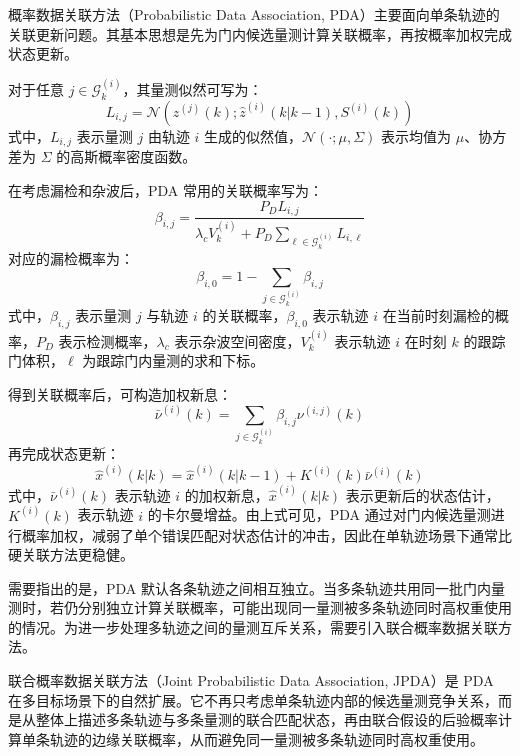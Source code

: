 \documentclass{xdupgthesis}
\begin{document}
概率数据关联方法（Probabilistic Data Association, PDA）主要面向单条轨迹的关联更新问题。其基本思想是先为门内候选量测计算关联概率，再按概率加权完成状态更新\cite{barshalom1975pda,chen2018weightedpda}。

对于任意 $j\in\mathcal{G}^{(i)}_k$，其量测似然可写为：
\begin{equation}
	L_{i,j}
	=
	\mathcal{N}
	\left(
	z^{(j)}(k);
	\hat{z}^{(i)}(k|k-1),
	S^{(i)}(k)
	\right)
\end{equation}
式中，$L_{i,j}$ 表示量测 $j$ 由轨迹 $i$ 生成的似然值，$\mathcal{N}(\cdot;\mu,\Sigma)$ 表示均值为 $\mu$、协方差为 $\Sigma$ 的高斯概率密度函数。

在考虑漏检和杂波后，PDA 常用的关联概率写为：
\begin{equation}
	\beta_{i,j}
	=
	\frac{P_D L_{i,j}}
	{\lambda_c V_k^{(i)}+P_D\sum\limits_{\ell\in\mathcal{G}^{(i)}_k}L_{i,\ell}}
\end{equation}
对应的漏检概率为：
\begin{equation}
	\beta_{i,0}
	=
	1-\sum_{j\in\mathcal{G}^{(i)}_k}\beta_{i,j}
\end{equation}
式中，$\beta_{i,j}$ 表示量测 $j$ 与轨迹 $i$ 的关联概率，$\beta_{i,0}$ 表示轨迹 $i$ 在当前时刻漏检的概率，$P_D$ 表示检测概率，$\lambda_c$ 表示杂波空间密度，$V_k^{(i)}$ 表示轨迹 $i$ 在时刻 $k$ 的跟踪门体积，$\ell$ 为跟踪门内量测的求和下标。

得到关联概率后，可构造加权新息：
\begin{equation}
	\bar{\nu}^{(i)}(k)
	=
	\sum_{j\in\mathcal{G}^{(i)}_k}
	\beta_{i,j}\nu^{(i,j)}(k)
\end{equation}
再完成状态更新：
\begin{equation}
	\hat{x}^{(i)}(k|k)
	=
	\hat{x}^{(i)}(k|k-1)
	+
	K^{(i)}(k)\bar{\nu}^{(i)}(k)
\end{equation}
式中，$\bar{\nu}^{(i)}(k)$ 表示轨迹 $i$ 的加权新息，$\hat{x}^{(i)}(k|k)$ 表示更新后的状态估计，$K^{(i)}(k)$ 表示轨迹 $i$ 的卡尔曼增益。由上式可见，PDA 通过对门内候选量测进行概率加权，减弱了单个错误匹配对状态估计的冲击，因此在单轨迹场景下通常比硬关联方法更稳健。

需要指出的是，PDA 默认各条轨迹之间相互独立。当多条轨迹共用同一批门内量测时，若仍分别独立计算关联概率，可能出现同一量测被多条轨迹同时高权重使用的情况。为进一步处理多轨迹之间的量测互斥关系，需要引入联合概率数据关联方法。


联合概率数据关联方法（Joint Probabilistic Data Association, JPDA）是 PDA 在多目标场景下的自然扩展。它不再只考虑单条轨迹内部的候选量测竞争关系，而是从整体上描述多条轨迹与多条量测的联合匹配状态，再由联合假设的后验概率计算单条轨迹的边缘关联概率，从而避免同一量测被多条轨迹同时高权重使用\cite{fortmann1983jpda,cheng1998fastjpda}。
\end{document}
